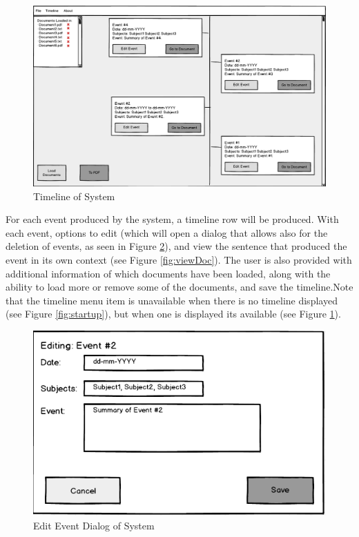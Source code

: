 \begin{figure}[h]
\caption{Timeline of System}
\label{fig:timeline}
\includegraphics[width=\linewidth]{timeline.png}
\centering
\end{figure}
\par For each event produced by the system, a timeline row will be produced. With each event, options to edit (which will open a dialog that allows also for the deletion of events, as seen in Figure \ref{fig:editDialog}), and view the sentence that produced the event in its own context (see Figure \ref{fig:viewDoc}). The user is also provided with additional information of which documents have been loaded, along with the ability to load more or remove some of the documents, and save the timeline.Note that the timeline menu item is unavailable when there is no timeline displayed (see Figure \ref{fig:startup}), but when one is displayed its available (see Figure \ref{fig:timeline}).
\begin{figure}[h]
\caption{Edit Event Dialog of System}
\label{fig:editDialog}
\includegraphics[scale=0.6]{editDialog.png}
\centering
\end{figure}
